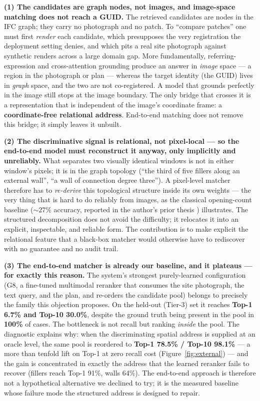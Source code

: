 \noindent\textbf{(1) The candidates are graph nodes, not images, and image-space matching does not
reach a GUID.} The retrieved candidates are nodes in the IFC graph; they carry no photograph and no
patch. To ``compare patches'' one must first \emph{render} each candidate, which presupposes the
very registration the deployment setting denies, and which pits a real site photograph against
synthetic renders across a large domain gap. More fundamentally, referring-expression and
cross-attention grounding produce an answer in \emph{image} space --- a region in the photograph or
plan --- whereas the target identity (the GUID) lives in \emph{graph} space, and the two are not
co-registered. A model that grounds perfectly in the image still stops at the image boundary. The
only bridge that crosses it is a representation that is independent of the image's coordinate frame:
a \textbf{coordinate-free relational address}. End-to-end matching does not remove this bridge; it
simply leaves it unbuilt.

\noindent\textbf{(2) The discriminative signal is relational, not pixel-local --- so the end-to-end
model must reconstruct it anyway, only implicitly and unreliably.} What separates two visually
identical windows is not in either window's pixels; it is in the graph topology (``the third of five
fillers along an external wall'', ``a wall of connection degree three''). A pixel-level matcher
therefore has to \emph{re-derive} this topological structure inside its own weights --- the very
thing that is hard to do reliably from images, as the classical opening-count baseline
(${\sim}27\%$ accuracy, reported in the author's prior thesis \citep{chiahuiyen_mscd_thesis})
illustrates. The structured decomposition does not avoid the difficulty; it relocates it into an
explicit, inspectable, and reliable form. The contribution is to make explicit the relational feature
that a black-box matcher would otherwise have to rediscover with no guarantee and no audit trail.

\noindent\textbf{(3) The end-to-end matcher is already our baseline, and it plateaus --- for exactly
this reason.} The system's strongest purely-learned configuration (G8, a fine-tuned multimodal
reranker that consumes the site photograph, the text query, and the plan, and re-orders the candidate
pool) belongs to precisely the family this objection proposes. On the held-out (Tier-3) set it
reaches \textbf{Top-1 6.7\% and Top-10 30.0\%}, despite the ground truth being present in the pool in
\textbf{100\%} of cases. The bottleneck is not recall but ranking \emph{inside} the pool. The
diagnostic explains why: when the discriminating spatial address is supplied at an oracle level, the
same pool is reordered to \textbf{Top-1 78.5\% / Top-10 98.1\%} --- a more than tenfold lift on Top-1
at zero recall cost (Figure~\ref{fig:external}) --- and the gain is concentrated in exactly the
address that the learned reranker fails to recover (fillers reach Top-1 91\%, walls 64\%). The
end-to-end approach is therefore not a hypothetical alternative we declined to try; it is the measured
baseline whose failure mode the structured address is designed to repair.


